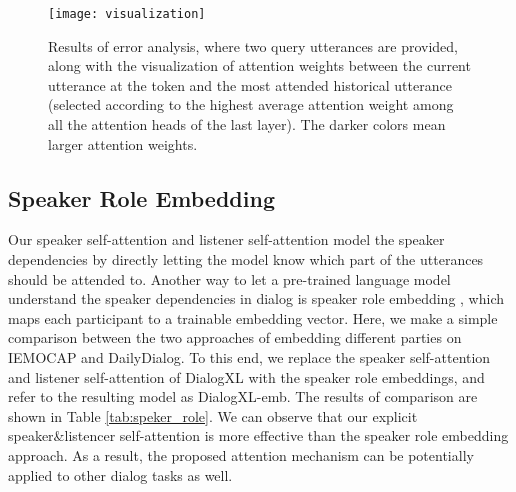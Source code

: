 \documentclass[letterpaper]{article} \usepackage{aaai21}  \usepackage{times}  \usepackage{helvet} \usepackage{courier}  \usepackage[hyphens]{url}  \usepackage{graphicx} \usepackage{amstext}
\begin{document}
\begin{table}[t]
	\centering
	\caption{Results of ablation study on IEMOCAP and MELD.}
	\label{tab:ablation}
\end{table}



\begin{figure*}[t]
	\centering
	\texttt{[image: visualization]} \caption{Results of error analysis, where two query utterances are provided, along with the visualization of attention weights between the current utterance at the \text{[CLS]} token and the most attended historical utterance (selected according to the highest average attention weight among all the attention heads of the last layer). The darker colors mean larger attention weights.}
	\label{fig:visualization}
\end{figure*}

\subsection{Speaker Role Embedding}
Our speaker self-attention and listener self-attention model the speaker dependencies \cite{ghosal2019dialoguegcn} by directly letting the model know which part of the utterances should be attended to. Another way to let a pre-trained language model understand the speaker dependencies in dialog is speaker role embedding \cite{bao2020plato,ham2020end}, which maps each participant to a trainable embedding vector. Here, we make a simple comparison between the two approaches of embedding different parties on IEMOCAP and DailyDialog. To this end, we replace the speaker self-attention and listener self-attention of DialogXL with the speaker role embeddings, and refer to the resulting model as DialogXL-emb. The results of comparison are shown in Table \ref{tab:speker_role}. We can observe that our explicit speaker\&listencer self-attention is more effective than the speaker role embedding approach. As a result, the proposed attention mechanism can be potentially applied to other dialog tasks as well.
\end{document}
